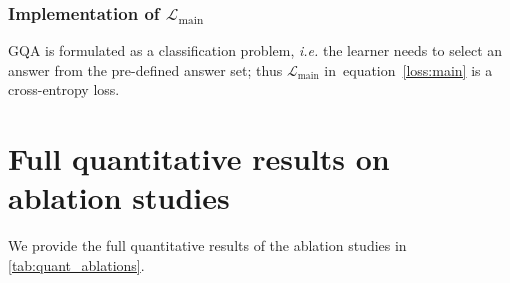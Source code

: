 \documentclass{article} \usepackage{iclr2022_conference,times}
\def\eqref#1{equation~\ref{#1}}
\newcommand{\loss}{\mathcal{L}}
\begin{document}
\subsubsection{Implementation of $\loss_{\operatorname{main}}$}

GQA is formulated as a classification problem, \emph{i.e.} the learner needs to select an answer from the pre-defined answer set; thus $\loss_{\operatorname{main}}$ in~\eqref{loss:main} is a cross-entropy loss.

\section{Full quantitative results on ablation studies}
We provide the full quantitative results of the ablation studies in \autoref{tab:quant_ablations}.
\end{document}

